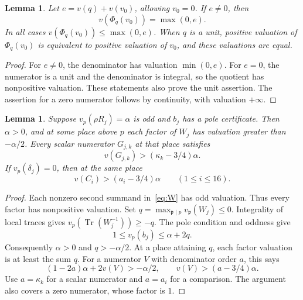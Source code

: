 \documentclass[11pt,a4paper]{article}
\newtheorem{lemma}[theorem]{Lemma}
\DeclareMathOperator{\Tr}{Tr}
\begin{document}
\begin{lemma}\label{lem:phi}
Let $e=v(q)+v(v_0)$, allowing $v_0=0$. If $e\ne0$, then
\[
                         v(\Phi_q(v_0))=\max(0,e).
\]
In all cases $v(\Phi_q(v_0))\le\max(0,e)$. When $q$ is a
unit, positive valuation of $\Phi_q(v_0)$ is equivalent to positive
valuation of $v_0$, and these valuations are equal.
\end{lemma}
\begin{proof}
For $e\ne0$, the denominator has valuation $\min(0,e)$.
For $e=0$, the numerator is a unit and the denominator is integral,
so the quotient has nonpositive valuation. These statements also
prove the unit assertion. The assertion for a zero numerator follows
by continuity, with valuation $+\infty$.
\end{proof}

\begin{lemma}\label{lem:trace}
Suppose $v_p(\rho R_j)=\alpha$ is odd and $b_j$ has a pole
certificate. Then $\alpha>0$, and at some place above $p$ each
factor of $W_j$ has valuation greater than $-\alpha/2$. Every
scalar numerator $G_{j,k}$ at that place satisfies
\[
                         v(G_{j,k})>(\kappa_k-3/4)\alpha.
\]
If $v_p(\delta_j)=0$, then at the same place
\begin{equation}\label{eq:raw-extraction}
                         v(C_i)>(a_i-3/4)\alpha
                         \qquad(1\le i\le16).
\end{equation}
\end{lemma}
\begin{proof}
Each nonzero second summand in~\eqref{eq:W} has odd valuation.
Thus every factor has nonpositive valuation. Set
$q=\max_{\mathfrak p\mid p}v_{\mathfrak p}(W_j)\le0$.
Integrality of local traces gives
$v_p(\Tr(W_j^{-1}))\ge-q$. The pole condition and oddness give
\[
                         1\le v_p(b_j)\le\alpha+2q.
\]
Consequently $\alpha>0$ and $q>-\alpha/2$. At a place attaining
$q$, each factor valuation is at least the sum $q$. For a numerator
$V$ with denominator order $a$, this says
\[
 (1-2a)\alpha+2v(V)>-\alpha/2,
 \qquad v(V)>(a-3/4)\alpha.
\]
Use $a=\kappa_k$ for a scalar numerator and $a=a_i$ for a comparison.
The argument also covers a zero numerator, whose factor is $1$.
\end{proof}
\end{document}
